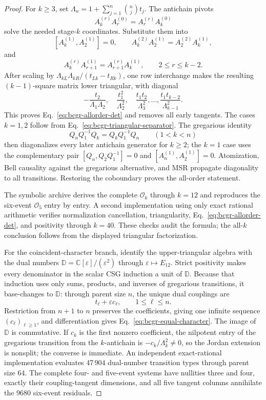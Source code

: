 \begin{proof}
For \(k\ge3\), set
\(\Lambda_n=1+\sum_{j=1}^n\binom njt_j\).  The antichain pivots
\[
A_k^{(r)}A_r^{(0)}=A_r^{(r)}A_k^{(0)}
\]
solve the needed stage-\(k\) coordinates.  Substitute them into
\[
[A_k^{(1)},A_2^{(1)}]=0,\qquad
A_k^{(2)}A_2^{(1)}=A_2^{(2)}A_k^{(1)},
\]
and
\[
A_k^{(r)}A_{r+1}^{(1)}
=A_{r+1}^{(r)}A_k^{(1)},\qquad2\le r\le k-2.
\]
After scaling by
\(\Lambda_{kL}\Lambda_{kR}/(t_{Lk}-t_{Rk})\), one row interchange makes
the resulting \((k-1)\)-square matrix lower triangular, with diagonal
\[
-\frac{t_2}{\Lambda_1\Lambda_2},\quad
\frac{t_1^2}{\Lambda_2^2},\quad
\frac{t_1t_2}{\Lambda_3^2},\ldots,
\frac{t_1t_{k-2}}{\Lambda_{k-1}^2}.
\]
This proves Eq.~\eqref{eq:bcgr-allorder-det} and removes all early
tangents.  The cases \(k=1,2\) follow from
Eq.~\eqref{eq:bcgr-triangular-separator}.  The gregarious identity
\[
Q_nQ_1^{-1}Q_k=Q_kQ_1^{-1}Q_n\qquad(1<k<n)
\]
then diagonalizes every later antichain generator for \(k\ge2\); the
\(k=1\) case uses the complementary pair
\([Q_n,Q_2Q_1^{-1}]=0\) and
\([A_n^{(1)},A_2^{(1)}]=0\).  Atomization, Bell causality against the
gregarious alternative, and MSR propagate diagonality to all transitions.
Restoring the coboundary proves the all-order statement.

The symbolic archive derives the complete \(\mathcal O_k\) through
\(k=12\) and reproduces the six-event \(\mathcal O_5\) entry by entry.  A
second implementation using only exact rational arithmetic verifies
normalization cancellation, triangularity, Eq.~\eqref{eq:bcgr-allorder-det},
and positivity through \(k=40\).  These checks audit the formula; the
all-\(k\) conclusion follows from the displayed triangular factorization.

For the coincident-character branch, identify the upper-triangular algebra
with the dual numbers
\(\mathbb D=\mathbb C[\varepsilon]/(\varepsilon^2)\) through
\(\varepsilon\mapsto E_{12}\).  Strict positivity makes every denominator
in the scalar CSG induction a unit of \(\mathbb D\).  Because that induction
uses only sums, products, and inverses of gregarious transitions, it
base-changes to \(\mathbb D\): through parent size \(n\), the unique dual
couplings are
\[
 t_\ell+\varepsilon c_\ell,\qquad1\le\ell\le n.
\]
Restriction from \(n+1\) to \(n\) preserves the coefficients, giving one
infinite sequence \((c_\ell)_{\ell\ge1}\), and differentiation gives
Eq.~\eqref{eq:bcgr-equal-character}.  The image of \(\mathbb D\) is
commutative.  If \(c_k\) is the first nonzero coefficient, the nilpotent
entry of the gregarious transition from the \(k\)-antichain is
\(-c_k/\Lambda_k^2\ne0\), so the Jordan extension is nonsplit; the converse
is immediate.  An independent exact-rational implementation evaluates
47\,904 dual-number transition types through parent size 64.  The complete
four- and five-event systems have nullities three and four, exactly their
coupling-tangent dimensions, and all five tangent columns annihilate the
9680 six-event residuals.


\end{proof}
